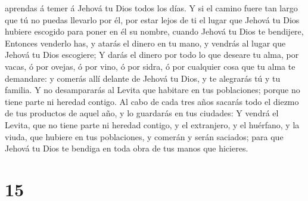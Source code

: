 aprendas á temer á Jehová tu Dios todos los días.  Y si
el camino fuere tan largo que tú no puedas llevarlo por él, por estar
lejos de ti el lugar que Jehová tu Dios hubiere escogido para poner en
él su nombre, cuando Jehová tu Dios te bendijere, 
Entonces venderlo has, y atarás el dinero en tu mano, y vendrás al lugar
que Jehová tu Dios escogiere;  Y darás el dinero por todo
lo que deseare tu alma, por vacas, ó por ovejas, ó por vino, ó por
sidra, ó por cualquier cosa que tu alma te demandare: y comerás allí
delante de Jehová tu Dios, y te alegrarás tú y tu familia.
 Y no desampararás al Levita que habitare en tus
poblaciones; porque no tiene parte ni heredad contigo. 
Al cabo de cada tres años sacarás todo el diezmo de tus productos de
aquel año, y lo guardarás en tus ciudades:  Y vendrá el
Levita, que no tiene parte ni heredad contigo, y el extranjero, y el
huérfano, y la viuda, que hubiere en tus poblaciones, y comerán y serán
saciados; para que Jehová tu Dios te bendiga en toda obra de tus manos
que hicieres.

\hypertarget{section-14}{%
\section{15}\label{section-14}}

